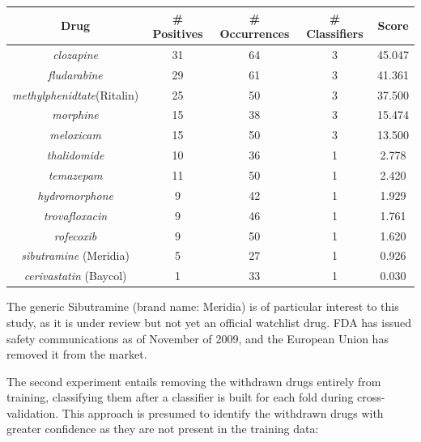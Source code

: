 \documentclass[twoside,11pt]{article}
\begin{document}
\begin{center}
  \begin{tabular}{||c c c c c||}
    \hline
    Drug & # Positives & # Occurrences & # Classifiers & Score \\
    \hline\hline
    \textit{clozapine} & 31 & 64 & 3 & 45.047 \\
    \hline
    \textit{fludarabine} & 29 & 61 & 3 & 41.361 \\
    \hline
    \textit{methylphenidtate}(Ritalin) & 25 & 50 & 3 & 37.500 \\
    \hline
    \textit{morphine} & 15 & 38 & 3 & 15.474 \\
    \hline
    \textit{meloxicam} & 15 & 50 & 3 & 13.500 \\
    \hline\hline
    \textit{thalidomide} & 10 & 36 & 1 & 2.778 \\
    \textit{temazepam} & 11 & 50 & 1 & 2.420 \\
    \textit{hydromorphone} & 9 & 42 & 1 & 1.929 \\
    \textit{trovafloxacin} & 9 & 46 & 1 & 1.761 \\
    \textit{rofecoxib} & 9 & 50 & 1 & 1.620 \\
    \textit{sibutramine} (Meridia) & 5 & 27 & 1 & 0.926 \\
    \textit{cerivastatin} (Baycol) & 1 & 33 & 1 & 0.030 \\
    \hline
  \end{tabular}
\end{center}
The generic Sibutramine (brand name: Meridia) is of particular interest to this study, as it is under review but not yet an official watchlist drug. FDA has issued safety communications as of November of 2009, and the European Union has removed it from the market.

The second experiment entails removing the withdrawn drugs entirely from training, classifying them after a classifier is built for each fold during cross-validation. This approach is presumed to identify the withdrawn drugs with greater confidence as they are not present in the training data:
\end{document}
